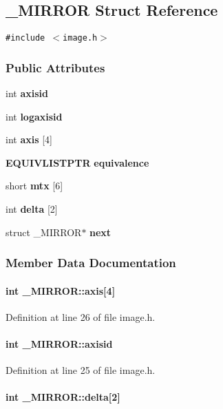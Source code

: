 \subsection{\_\-MIRROR  Struct Reference}
\label{_MIRROR}
{\tt \#include $<$image.h$>$}

\subsubsection*{Public Attributes}
\begin{CompactItemize}
\item 
int {\bf axisid}
\item 
int {\bf logaxisid}
\item 
int {\bf axis} [4]
\item 
{\bf EQUIVLISTPTR} {\bf equivalence}
\item 
short {\bf mtx} [6]
\item 
int {\bf delta} [2]
\item 
struct \_\-MIRROR$\ast$ {\bf next}
\end{CompactItemize}


\subsubsection{Member Data Documentation}
\label{_MIRROR_m2}
\paragraph{\setlength{\rightskip}{0pt plus 5cm}int \_\-MIRROR::axis[4]}\hfill



Definition at line 26 of file image.h.\label{_MIRROR_m0}
\paragraph{\setlength{\rightskip}{0pt plus 5cm}int \_\-MIRROR::axisid}\hfill



Definition at line 25 of file image.h.\label{_MIRROR_m5}
\paragraph{\setlength{\rightskip}{0pt plus 5cm}int \_\-MIRROR::delta[2]}\hfill



